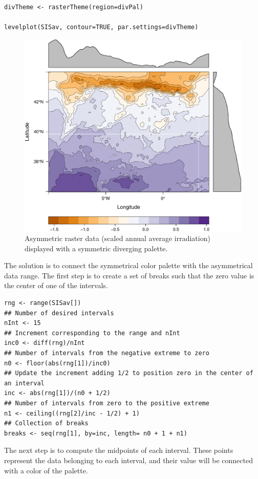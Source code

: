 \lstset{language=R,numbers=none}
\begin{lstlisting}
divTheme <- rasterTheme(region=divPal)

levelplot(SISav, contour=TRUE, par.settings=divTheme)
\end{lstlisting}

\begin{figure}[htb]
\centering
\includegraphics[width=.9\linewidth]{figs/divPal_SISav_naive.pdf}
\caption{\label{fig:divPal_SISav_naive}Asymmetric raster data (scaled annual average irradiation) displayed with a symmetric diverging palette.}
\end{figure}

The solution is to connect the symmetrical color palette with the
asymmetrical data range. The first step is to create a set of
breaks such that the zero value is the center of one of the
intervals.
\lstset{language=R,numbers=none}
\begin{lstlisting}
rng <- range(SISav[])
## Number of desired intervals
nInt <- 15
## Increment corresponding to the range and nInt
inc0 <- diff(rng)/nInt
## Number of intervals from the negative extreme to zero
n0 <- floor(abs(rng[1])/inc0)
## Update the increment adding 1/2 to position zero in the center of an interval
inc <- abs(rng[1])/(n0 + 1/2)
## Number of intervals from zero to the positive extreme
n1 <- ceiling((rng[2]/inc - 1/2) + 1)
## Collection of breaks
breaks <- seq(rng[1], by=inc, length= n0 + 1 + n1)
\end{lstlisting}

The next step is to compute the midpoints of each interval. These
points represent the data belonging to each interval, and their value
will be connected with a color of the palette.

